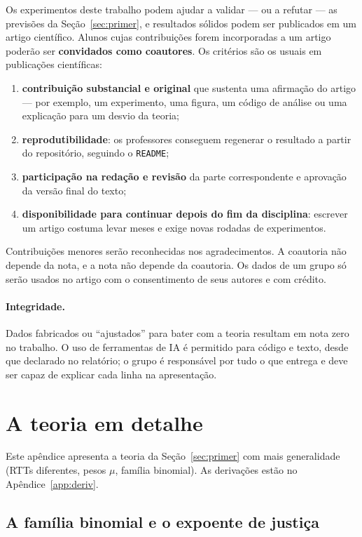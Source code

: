 \documentclass[11pt,a4paper]{article}
\begin{document}
Os experimentos deste trabalho podem ajudar a validar --- ou a refutar --- as previsões
da Seção~\ref{sec:primer}, e resultados sólidos podem ser publicados em um artigo
científico. Alunos cujas contribuições forem incorporadas a um artigo poderão ser
\textbf{convidados como coautores}. Os critérios são os usuais em publicações
científicas:
\begin{enumerate}
\item \textbf{contribuição substancial e original} que sustenta uma afirmação do artigo
--- por exemplo, um experimento, uma figura, um código de análise ou uma explicação para
um desvio da teoria;
\item \textbf{reprodutibilidade}: os professores conseguem regenerar o resultado a
partir do repositório, seguindo o \texttt{README};
\item \textbf{participação na redação e revisão} da parte correspondente e aprovação da
versão final do texto;
\item \textbf{disponibilidade para continuar depois do fim da disciplina}: escrever um
artigo costuma levar meses e exige novas rodadas de experimentos.
\end{enumerate}
Contribuições menores serão reconhecidas nos agradecimentos. A coautoria não depende da
nota, e a nota não depende da coautoria. Os dados de um grupo só serão usados no artigo
com o consentimento de seus autores e com crédito.

\paragraph{Integridade.} Dados fabricados ou “ajustados” para bater com a teoria
resultam em nota zero no trabalho. O uso de ferramentas de IA é permitido para código e
texto, desde que declarado no relatório; o grupo é responsável por tudo o que entrega e
deve ser capaz de explicar cada linha na apresentação.

\appendix
\section{A teoria em detalhe}
\label{app:teoria}

Este apêndice apresenta a teoria da Seção~\ref{sec:primer} com mais generalidade (RTTs
diferentes, pesos $\mu$, família binomial). As derivações estão no Apêndice~\ref{app:deriv}.

\subsection{A família binomial e o expoente de justiça}
\end{document}
